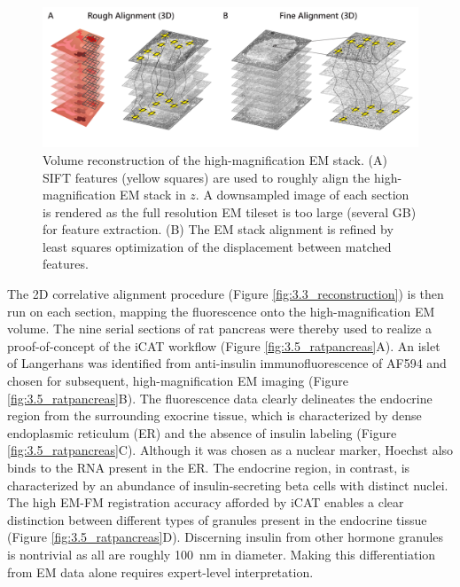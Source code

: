 \begin{figure}[!tb]
    \centering
    \includegraphics[width=\linewidth]{chapter-3/figures_PDF/fig3-4_3Dalign.pdf}
    \caption{Volume reconstruction of the high-magnification EM stack.
    (A) SIFT features (yellow squares) are used to roughly align the high-magnification EM stack in $z$. A downsampled image of each section is rendered as the full resolution EM tileset is too large (several GB) for feature extraction.
    (B) The EM stack alignment is refined by least squares optimization of the displacement between matched features.}
    \label{fig:3.4_3Dalign}
\end{figure}

The 2D correlative alignment procedure (Figure \ref{fig:3.3_reconstruction}) is then run on each section, mapping the fluorescence onto the high-magnification EM volume. The nine serial sections of rat pancreas were thereby used to realize a proof-of-concept of the iCAT workflow (Figure \ref{fig:3.5_ratpancreas}A). An islet of Langerhans was identified from anti-insulin immunofluorescence of AF594 and chosen for subsequent, high-magnification EM imaging (Figure \ref{fig:3.5_ratpancreas}B). The fluorescence data clearly delineates the endocrine region from the surrounding exocrine tissue, which is characterized by dense endoplasmic reticulum (ER) and the absence of insulin labeling (Figure \ref{fig:3.5_ratpancreas}C). Although it was chosen as a nuclear marker, Hoechst also binds to the RNA present in the ER. The endocrine region, in contrast, is characterized by an abundance of insulin-secreting beta cells with distinct nuclei. The high EM-FM registration accuracy afforded by iCAT enables a clear distinction between different types of granules present in the endocrine tissue (Figure \ref{fig:3.5_ratpancreas}D). Discerning insulin from other hormone granules is nontrivial as all are roughly \SI{100}{\nano\meter} in diameter. Making this differentiation from EM data alone requires expert-level interpretation.

